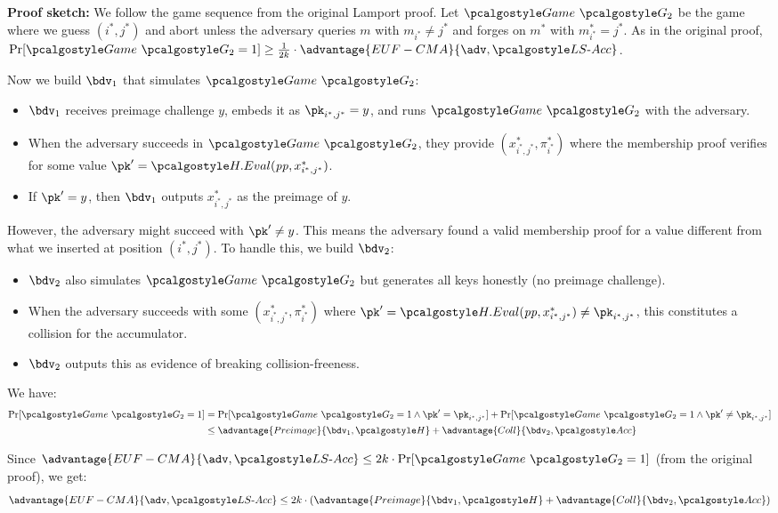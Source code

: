 \begin{mysolution}
\begin{enumerate}
    \textbf{Proof sketch:}
    We follow the game sequence from the original Lamport proof.
    Let $\Game~\algo{G_2}$ be the game where we guess $(i^*, j^*)$ and abort unless the adversary queries $m$ with $m_{i^*} \neq j^*$ and forges on $m^*$ with $m^*_{i^*} = j^*$.
    As in the original proof, $\Pr[\Game~\algo{G_2} = 1] \geq \frac{1}{2k} \cdot \advantage{EUF-CMA}{\adv, \algo{LS\text{-}Acc}}$.
    
    Now we build $\bdv_1$ that simulates $\Game~\algo{G_2}$:
    \begin{itemize}
      \item $\bdv_1$ receives preimage challenge $y$, embeds it as $\pk_{i^*,j^*} = y$, and runs $\Game~\algo{G_2}$ with the adversary.
      \item When the adversary succeeds in $\Game~\algo{G_2}$, they provide $(x^*_{i^*,j^*}, \pi^*_{i^*})$ where the membership proof verifies for some value $\pk' = \algo{H.Eval}(\params, x^*_{i^*,j^*})$.
      \item If $\pk' = y$, then $\bdv_1$ outputs $x^*_{i^*,j^*}$ as the preimage of $y$.
    \end{itemize}
    
    However, the adversary might succeed with $\pk' \neq y$.
    This means the adversary found a valid membership proof for a value different from what we inserted at position $(i^*, j^*)$.
    To handle this, we build $\bdv_2$:
    \begin{itemize}
      \item $\bdv_2$ also simulates $\Game~\algo{G_2}$ but generates all keys honestly (no preimage challenge).
      \item When the adversary succeeds with some $(x^*_{i^*,j^*}, \pi^*_{i^*})$ where $\pk' = \algo{H.Eval}(\params, x^*_{i^*,j^*}) \neq \pk_{i^*,j^*}$, this constitutes a collision for the accumulator.
      \item $\bdv_2$ outputs this as evidence of breaking collision-freeness.
    \end{itemize}
    
    We have:
    \begin{align}
      \Pr[\Game~\algo{G_2} = 1] &= \Pr[\Game~\algo{G_2} = 1 \wedge \pk' = \pk_{i^*,j^*}] + \Pr[\Game~\algo{G_2} = 1 \wedge \pk' \neq \pk_{i^*,j^*}]\\
      &\leq \advantage{Preimage}{\bdv_1, \algo{H}} + \advantage{Coll}{\bdv_2, \algo{Acc}}
    \end{align}
    
    Since $\advantage{EUF-CMA}{\adv, \algo{LS\text{-}Acc}} \leq 2k \cdot \Pr[\Game~\algo{G_2} = 1]$ (from the original proof), we get:
    \[
      \advantage{EUF-CMA}{\adv, \algo{LS\text{-}Acc}} \leq 2k \cdot (\advantage{Preimage}{\bdv_1, \algo{H}} + \advantage{Coll}{\bdv_2, \algo{Acc}})
    \]
  \end{enumerate}
\end{mysolution}
\fi

